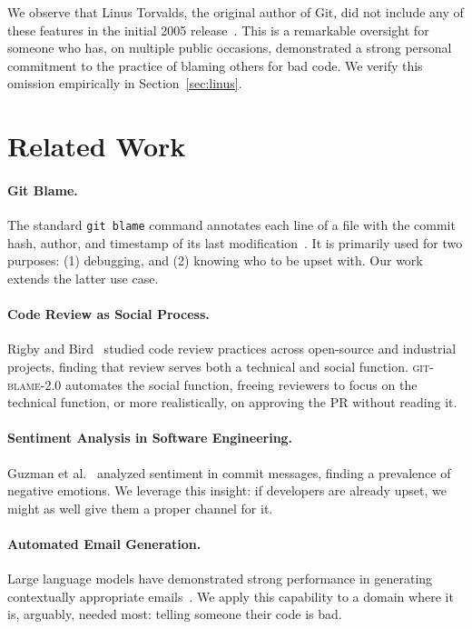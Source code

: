 \documentclass{sigtbd}
\begin{document}
We observe that Linus Torvalds, the original author of Git, did not include any of these features in the initial 2005 release~\cite{Torvalds:2005}. This is a remarkable oversight for someone who has, on multiple public occasions, demonstrated a strong personal commitment to the practice of blaming others for bad code. We verify this omission empirically in Section~\ref{sec:linus}.

\section{Related Work}

\paragraph{Git Blame.} The standard \texttt{git blame} command annotates each line of a file with the commit hash, author, and timestamp of its last modification~\cite{Torvalds:2005}. It is primarily used for two purposes: (1) debugging, and (2) knowing who to be upset with. Our work extends the latter use case.

\paragraph{Code Review as Social Process.} Rigby and Bird~\cite{Rigby:2013} studied code review practices across open-source and industrial projects, finding that review serves both a technical and social function. \textsc{git-blame-2.0} automates the social function, freeing reviewers to focus on the technical function, or more realistically, on approving the PR without reading it.

\paragraph{Sentiment Analysis in Software Engineering.} Guzman et al.~\cite{Guzman:2014} analyzed sentiment in commit messages, finding a prevalence of negative emotions. We leverage this insight: if developers are already upset, we might as well give them a proper channel for it.

\paragraph{Automated Email Generation.} Large language models have demonstrated strong performance in generating contextually appropriate emails~\cite{Brown:2020}. We apply this capability to a domain where it is, arguably, needed most: telling someone their code is bad.
\end{document}
